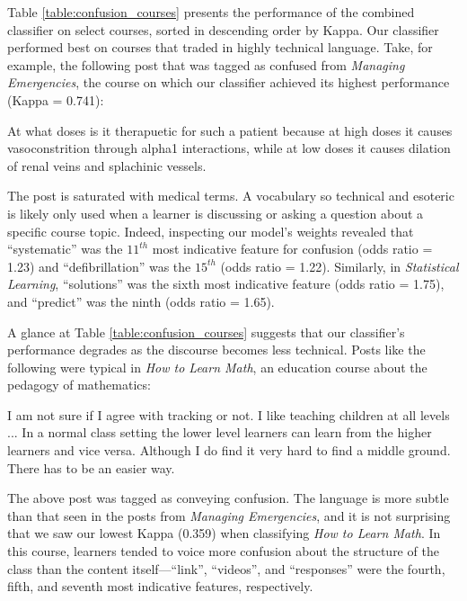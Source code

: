 \documentclass{edm_template}
\begin{document}
Table \ref{table:confusion_courses} presents the performance of the combined classifier on select courses, sorted in descending order by Kappa. Our classifier performed best on courses that traded in highly technical language. Take, for example, the following post that was tagged as confused from \emph{Managing Emergencies}, the course on which our classifier achieved its highest performance (Kappa = 0.741):

\vspace{-10pt}
\begin{displayquote}
At what doses is it therapuetic for such a patient because at high doses it causes vasoconstrition through alpha1 interactions, while at low doses it causes dilation of renal veins and splachinic vessels.
\end{displayquote}
\vspace{-10pt}

The post is saturated with medical terms. A vocabulary so technical and esoteric is likely only used when a learner is discussing or asking a question about a specific course topic. Indeed, inspecting our model's weights revealed that ``systematic'' was the $11^{th}$ most indicative feature for confusion (odds ratio = 1.23) and ``defibrillation'' was the $15^{th}$ (odds ratio = 1.22). Similarly, in \emph{Statistical Learning}, ``solutions'' was the sixth most indicative feature (odds ratio = 1.75), and ``predict'' was the ninth (odds ratio = 1.65).

A glance at Table \ref{table:confusion_courses} suggests that our classifier's performance degrades as the discourse becomes less technical. Posts like the following were typical in \emph{How to Learn Math}, an education course about the pedagogy of mathematics:

\vspace{-10pt}
\begin{displayquote}
I am not sure if I agree with tracking or not.  I like teaching children at all levels ...  In a normal class setting the lower level learners can learn from the higher learners and vice versa.  Although I do find it very hard to find a middle ground. There has to be an easier way.
\vspace{-10pt}
\end{displayquote}

The above post was tagged as conveying confusion. The language is more subtle than that seen in the posts from \emph{Managing Emergencies}, and it is not surprising that we saw our lowest Kappa (0.359) when classifying \emph{How to Learn Math}. In this course, learners tended to voice more confusion about the structure of the class than the content itself---``link'', ``videos'', and ``responses'' were the fourth, fifth, and seventh most indicative features, respectively.
\end{document}
